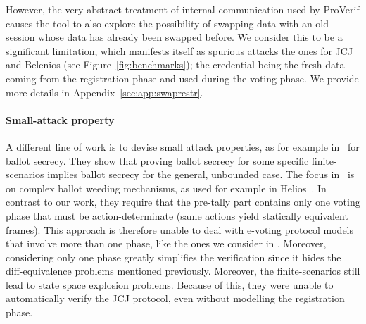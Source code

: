 However, the very abstract treatment of internal communication used by ProVerif
causes the tool to also explore the possibility of swapping
data with an old session whose data has already been swapped before. We
consider this to be a significant limitation,
which manifests itself as 
spurious attacks \eg the ones for JCJ and Belenios (see Figure~\ref{fig:benchmarks}); the credential being
the fresh data coming from the registration phase and used during the voting
phase.
We provide more details in Appendix~\ref{sec:app:swaprestr}.


\paragraph{\textbf{Small-attack property}}
\label{sec:rel:others}
A different line of work is to devise small attack properties, as
for example in~\cite{vote-ESO16}
for ballot secrecy. 
They show that proving ballot secrecy for some specific finite-scenarios implies ballot secrecy for the
general, unbounded case. 
The focus in~\cite{vote-ESO16} is on complex ballot weeding mechanisms,
as used for example in Helios~\cite{adida2008helios}.
In contrast to our work, they require that the pre-tally part 
contains only
one voting phase %
that must be action-determinate (same actions yield
statically equivalent frames). This approach is therefore unable to deal with e-voting protocol
models that involve more than one phase, like the ones we consider in .
Moreover, considering only one phase greatly simplifies the verification since
it hides the diff-equivalence problems mentioned
previously.
Moreover, the finite-scenarios still lead to state space explosion problems.
Because of this, they were unable to automatically verify the JCJ
protocol, even without modelling the registration phase.



